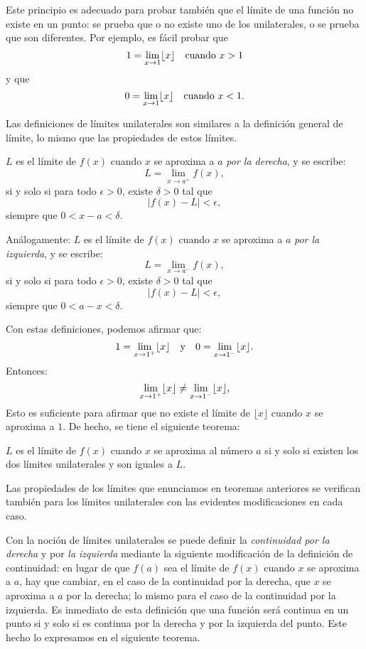 Este principio es adecuado para probar también que el límite de una función no existe en un punto:
se prueba que o no existe uno de los unilaterales, o se prueba que son diferentes. Por ejemplo, es
fácil probar que
\[
1 = \limjc{\lfloor x \rfloor}{x}{1} \quad \text{cuando} \ x > 1
\]
y que
\[
0 = \limjc{\lfloor x \rfloor}{x}{1} \quad \text{cuando} \ x < 1.
\]

Las definiciones de límites unilaterales son similares a la definición general de límite, lo mismo
que las propiedades de estos límites.


\begin{defical}
$L$ es el límite de $f(x)$ cuando $x$ se aproxima a $a$ \emph{por la derecha}, y se escribe:
\begin{equation*}
	L=\lim_{x \rightarrow a^+}f(x),
\end{equation*}
si y solo si para todo $\epsilon > 0$, existe $\delta > 0$ tal que
\[
|f(x) - L| < \epsilon,
\]
siempre que $0 < x - a < \delta$.

Análogamente: $L$ es el límite de $f(x)$ cuando $x$ se aproxima a $a$ \emph{por la izquierda}, y se
escribe:
\begin{equation*}
	L=\lim_{x \rightarrow a^-}f(x),
\end{equation*}
si y solo si para todo $\epsilon > 0$, existe $\delta > 0$ tal que
\[
|f(x) - L| < \epsilon,
\]
siempre que $0 < a - x < \delta$.
\end{defical}

Con estas definiciones, podemos afirmar que:
\[
1 = \limjc{\lfloor x \rfloor}{x}{1^+} \yjc 0 = \limjc{\lfloor x \rfloor}{x}{1^-}.
\]
Entonces:
\[
\limjc{\lfloor x \rfloor}{x}{1^+} \neq \limjc{\lfloor x \rfloor}{x}{1^-},
\]
Esto es suficiente para afirmar que no existe el límite de $\lfloor x \rfloor$ cuando $x$ se
aproxima a $1$. De hecho, se tiene el siguiente teorema:

\begin{teocal}$L$ es el límite de $f(x)$ cuando $x$ se aproxima al número $a$ si y solo si
existen los dos límites unilaterales y son iguales a $L$.
\end{teocal}

Las propiedades de los límites que enunciamos en teoremas anteriores se verifican también para los
límites unilaterales con las evidentes modificaciones en cada caso.

Con la noción de límites unilaterales se puede definir la \emph{continuidad por la derecha} y por
\emph{la izquierda} mediante la siguiente modificación de la definición de continuidad: en lugar de
que $f(a)$ sea el límite de $f(x)$ cuando $x$ se aproxima a $a$, hay que cambiar, en el caso de la
continuidad por la derecha, que $x$ se aproxima a $a$ por la derecha; lo mismo para el caso de la
continuidad por la izquierda. Es inmediato de esta definición que una función será continua en un
punto si y solo si es continua por la derecha y por la izquierda del punto. Este hecho lo
expresamos en el siguiente teorema.

